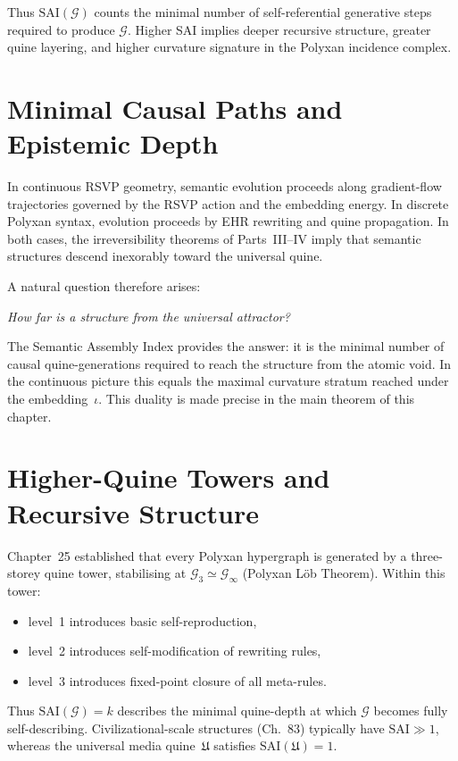 Thus $\mathrm{SAI}(\mathcal{G})$ counts the minimal number of
self-referential generative steps required to produce $\mathcal{G}$.
Higher SAI implies deeper recursive structure, greater quine layering,
and higher curvature signature in the Polyxan incidence complex.



\section{Minimal Causal Paths and Epistemic Depth}

In continuous RSVP geometry, semantic evolution proceeds along
gradient-flow trajectories governed by the RSVP action and the
embedding energy.  In discrete Polyxan syntax, evolution proceeds by
EHR rewriting and quine propagation.
In both cases, the irreversibility theorems of Parts~III--IV imply that
semantic structures descend inexorably toward the universal quine.

A natural question therefore arises:

\medskip
\emph{How far is a structure from the universal attractor?}
\medskip

The Semantic Assembly Index provides the answer:
it is the minimal number of causal quine-generations required to reach the
structure from the atomic void.  In the continuous picture this equals the
maximal curvature stratum reached under the embedding~$\iota$.
This duality is made precise in the main theorem of this chapter.



\section{Higher-Quine Towers and Recursive Structure}

Chapter~25 established that every Polyxan hypergraph is generated by a
three-storey quine tower, stabilising at
$\mathcal{G}_3\simeq\mathcal{G}_\infty$ (Polyxan L\"ob Theorem).
Within this tower:

\begin{itemize}
  \item level~1 introduces basic self-reproduction,
  \item level~2 introduces self-modification of rewriting rules,
  \item level~3 introduces fixed-point closure of all meta-rules.
\end{itemize}

Thus $\mathrm{SAI}(\mathcal{G})=k$ describes the minimal quine-depth
at which $\mathcal{G}$ becomes fully self-describing.
Civilizational-scale structures (Ch.~83) typically have
$\mathrm{SAI}\gg 1$, whereas the universal media quine~$\mathfrak{U}$
satisfies $\mathrm{SAI}(\mathfrak{U})=1$.

